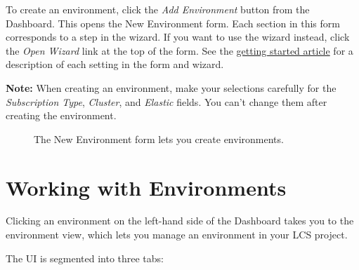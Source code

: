 To create an environment, click the \emph{Add Environment} button from
the Dashboard. This opens the New Environment form. Each section in this
form corresponds to a step in the wizard. If you want to use the wizard
instead, click the \emph{Open Wizard} link at the top of the form. See
the
\href{/docs/7-2/deploy/-/knowledge_base/d/getting-started-with-lcs}{getting
started article} for a description of each setting in the form and
wizard.

\noindent\hrulefill

\textbf{Note:} When creating an environment, make your selections
carefully for the \emph{Subscription Type}, \emph{Cluster}, and
\emph{Elastic} fields. You can't change them after creating the
environment.

\noindent\hrulefill

\begin{figure}
\centering
{}
\caption{The New Environment form lets you create environments.}
\end{figure}

\section{Working with Environments}\label{working-with-environments}

Clicking an environment on the left-hand side of the Dashboard takes you
to the environment view, which lets you manage an environment in your
LCS project.

The UI is segmented into three tabs:

